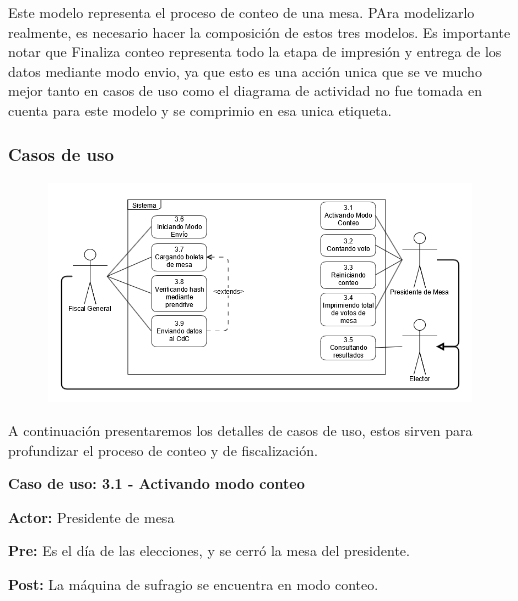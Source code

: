 Este modelo representa el proceso de conteo de una mesa. PAra modelizarlo realmente, es necesario hacer la composición de estos tres modelos. Es importante notar que Finaliza conteo representa todo la etapa de impresión y entrega de los datos mediante modo envio, ya que esto es una acción unica que se ve mucho mejor tanto en casos de uso como el diagrama de actividad no fue tomada en cuenta para este modelo y se comprimio en esa unica etiqueta.


\newpage

\subsubsection{Casos de uso}

\begin{figure}[h!]
\centering
\includegraphics[scale=0.5]{imagenes/CU/casosdeusoconteo}
\end{figure}			

A continuación presentaremos los detalles de casos de uso, estos sirven para profundizar el proceso de conteo y de fiscalización.


\textbf{Caso de uso: 3.1 - Activando modo conteo}

\textbf{Actor:} Presidente de mesa

\textbf{Pre:} Es el día de las elecciones, y se cerró la mesa del presidente.

\textbf{Post:} La máquina de sufragio se encuentra en modo conteo.

